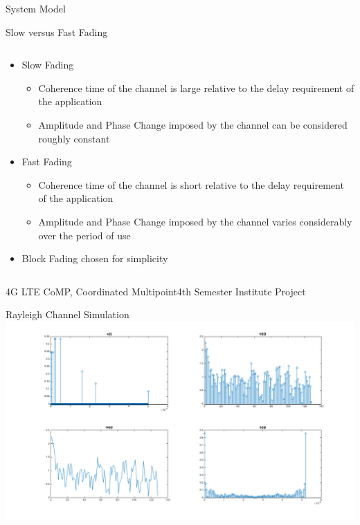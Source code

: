 \documentclass[xcolor={cmyk}]{beamer}
\begin{document}
  \begin{frame}{System Model}
	 \begin{block}{Slow versus Fast Fading}
	 	\begin{columns}
			\begin{column}{.9\textwidth}
				\begin{itemize}
					\item Slow Fading
					\begin{itemize}
						\item Coherence time of the channel is large relative to the delay requirement of the application
						\item Amplitude and Phase Change imposed by the channel can be considered roughly constant
					\end{itemize}
					\item Fast Fading
					\begin{itemize}
						\item Coherence time of the channel is short relative to the delay requirement of the application
						\item Amplitude and Phase Change imposed by the channel varies considerably over the period of use
					\end{itemize}
					
					
					\item Block Fading chosen for simplicity
				\end{itemize}
			\end{column}
		\end{columns}
	 \end{block}
 \end{frame}
 
  \begin{frame}{4G LTE CoMP, Coordinated Multipoint}{4th Semester Institute Project}
	 \begin{block}{Rayleigh Channel Simulation}
		 \includegraphics[width=\linewidth,height=\textheight,keepaspectratio]{channel.png}
	 \end{block}
 \end{frame}
 
\end{document}
